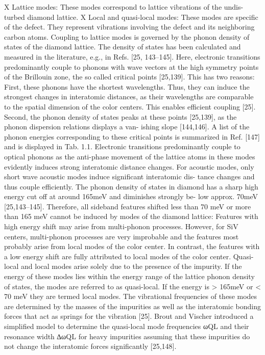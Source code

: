       X Lattice modes: These modes correspond to lattice vibrations of the undis- turbed diamond lattice.
      X Local and quasi-local modes: These modes are specific of the defect. They represent vibrations involving the defect and its neighboring carbon atoms.
      Coupling to lattice modes is governed by the phonon density of states of the diamond lattice. The density of states has been calculated and measured in the literature, e.g., in Refs. [25, 143–145]. Here, electronic transitions predominantly couple to phonons with wave vectors at the high symmetry points of the Brillouin zone, the so called critical points [25,139]. This has two reasons: First, these phonons have the shortest wavelengths. Thus, they can induce the strongest changes in interatomic distances, as their wavelengths are comparable to the spatial dimension of the color centers. This enables efficient coupling [25]. Second, the phonon density of states peaks at these points [25,139], as the phonon dispersion relations displays a van- ishing slope [144,146]. A list of the phonon energies corresponding to these critical points is summarized in Ref. [147] and is displayed in Tab. 1.1. Electronic transitions predominantly couple to optical phonons as the anti-phase movement of the lattice atoms in these modes evidently induces strong interatomic distance changes. For acoustic modes, only short wave acoustic modes induce significant interatomic dis- tance changes and thus couple efficiently. The phonon density of states in diamond has a sharp high energy cut off at around 165meV and diminishes strongly be- low approx. 70meV [25,143–145]. Therefore, all sideband features shifted less than 70 meV or more than 165 meV cannot be induced by modes of the diamond lattice: Features with high energy shift may arise from multi-phonon processes. However, for SiV centers, multi-phonon processes are very improbable and the features most probably arise from local modes of the color center. In contrast, the features with a low energy shift are fully attributed to local modes of the color center.
      Quasi-local and local modes arise solely due to the presence of the impurity. If the energy of these modes lies within the energy range of the lattice phonon density of states, the modes are referred to as quasi-local. If the energy is > 165meV or < 70 meV they are termed local modes. The vibrational frequencies of these modes are determined by the masses of the impurities as well as the interatomic bonding forces that act as springs for the vibration [25]. Brout and Vischer introduced a simplified model to determine the quasi-local mode frequencies ωQL and their resonance width ∆ωQL for heavy impurities assuming that these impurities do not change the interatomic forces significantly [25,148].

